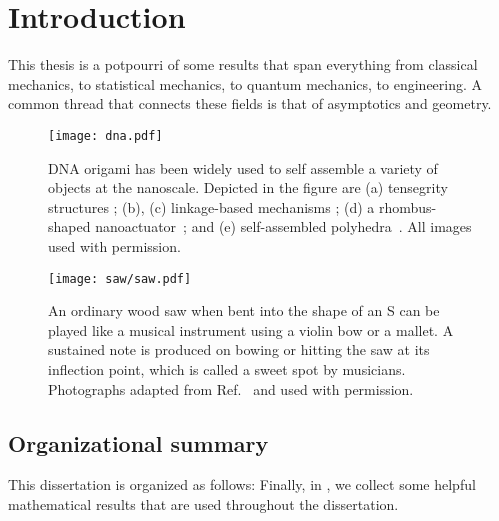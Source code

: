 
\chapter{Introduction}

This thesis is a potpourri of some results that span everything from classical mechanics, to statistical mechanics, to quantum mechanics, to engineering.
A common thread that connects these fields is that of asymptotics and geometry.

\begin{figure}
  \begin{center}
    \texttt{[image: dna.pdf]}
  \end{center}
  \caption{DNA origami has been widely used to self assemble a variety of objects at the nanoscale.
    Depicted in the figure are (a) tensegrity structures \cite{liedl2010}; (b), (c) linkage-based mechanisms \cite{marras2015,zhou2015}; (d) a rhombus-shaped nanoactuator~\cite{ke2016}; and (e) self-assembled polyhedra~\cite{iinuma2014}.  All images used with permission.}
  \label{fig:dna_origami}
\end{figure}

\begin{figure}
  \begin{center}
    \texttt{[image: saw/saw.pdf]}
  \end{center}
  \caption{%
    An ordinary wood saw when bent into the shape of an S can be played like a musical instrument using a violin bow or a mallet.
    A sustained note is produced on bowing or hitting the saw at its inflection point, which is called a sweet spot by musicians.
    Photographs adapted from Ref.~\cite{shankar2022} and used with permission.
  }
  \label{fig:saw}
\end{figure}

\section{Organizational summary}

This dissertation is organized as follows:
Finally, in , we collect some helpful mathematical results that are used throughout the dissertation.
